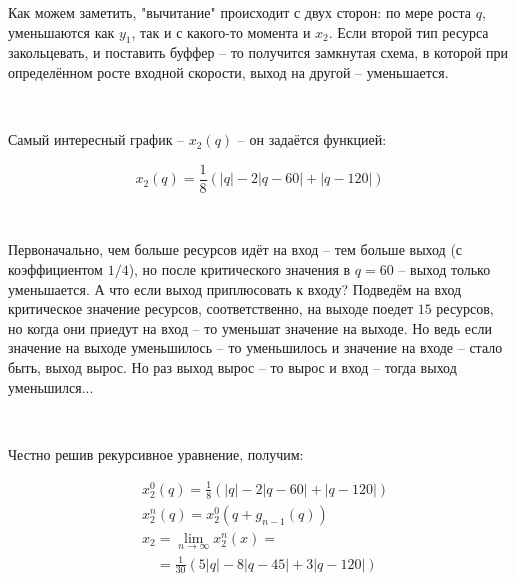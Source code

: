 \vspace{0.5in}

Как можем заметить, "вычитание" происходит с двух сторон: по мере роста $q$, уменьшаются как $y_1$, так и с какого-то момента и $x_2$. Если второй тип ресурса закольцевать, и поставить буффер -- то получится замкнутая схема, в которой при определённом росте входной скорости, выход на другой -- уменьшается.

\

\noindent Самый интересный график -- $x_2(q)$ -- он задаётся функцией:	

$$
x_2(q) = \frac18 \left( |q| - 2|q-60| + |q-120| \right)
$$

\

Первоначально, чем больше ресурсов идёт на вход -- тем больше выход (с коэффициентом $1/4$), но после критического значения в $q=60$ -- выход только уменьшается. А что если выход приплюсовать к входу? Подведём на вход критическое значение ресурсов, соответственно, на выходе поедет $15$ ресурсов, но когда они приедут на вход -- то уменьшат значение на выходе. Но ведь если значение на выходе уменьшилось -- то уменьшилось и значение на входе -- стало быть, выход вырос. Но раз выход вырос -- то вырос и вход -- тогда выход уменьшился...

\

\noindent Честно решив рекурсивное уравнение, получим:

\begin{align*}
	&x^0_2(q) = \frac18 \left( |q| - 2|q-60| + |q-120| \right)\\
	&x^n_2(q) = x^0_2(q + g_{n-1}(q))\\
	&x_2 = \lim_{n\to\infty} x^n_2(x) = \\
	&\quad = \frac1{30} \left( 5|q| - 8|q-45| + 3|q-120| \right)
\end{align*}






\vspace{0.5in}

